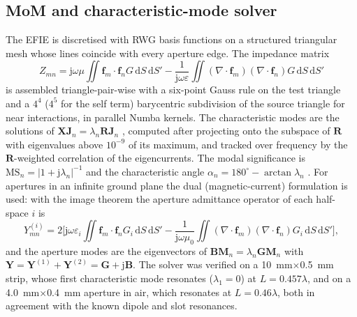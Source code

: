 \documentclass[preprint,12pt]{elsarticle}
\begin{document}
\subsection{MoM and characteristic-mode solver}
The EFIE is discretised with RWG basis functions on a structured triangular mesh whose lines coincide with every aperture edge. The impedance matrix
\begin{equation}
Z_{mn} = \mathrm{j}\omega\mu\iint \mathbf{f}_m\cdot\mathbf{f}_n G\,\mathrm{d}S\,\mathrm{d}S' - \frac{1}{\mathrm{j}\omega\varepsilon}\iint (\nabla\!\cdot\!\mathbf{f}_m)(\nabla\!\cdot\!\mathbf{f}_n) G\,\mathrm{d}S\,\mathrm{d}S'
\label{eq:zmn}
\end{equation}
is assembled triangle-pair-wise with a six-point Gauss rule on the test triangle and a $4^4$ ($4^5$ for the self term) barycentric subdivision of the source triangle for near interactions, in parallel Numba kernels. The characteristic modes are the solutions of $\mathbf{X}\mathbf{J}_n = \lambda_n\mathbf{R}\mathbf{J}_n$ \cite{harrington1971b}, computed after projecting onto the subspace of $\mathbf{R}$ with eigenvalues above $10^{-9}$ of its maximum, and tracked over frequency by the $\mathbf{R}$-weighted correlation of the eigencurrents. The modal significance is $\mathrm{MS}_n = |1+\mathrm{j}\lambda_n|^{-1}$ and the characteristic angle $\alpha_n = 180^\circ - \arctan\lambda_n$ \cite{cabedo2007}. For apertures in an infinite ground plane the dual (magnetic-current) formulation is used: with the image theorem the aperture admittance operator of each half-space $i$ is
\begin{equation}
Y^{(i)}_{mn} = 2\Big[\mathrm{j}\omega\varepsilon_i\iint \mathbf{f}_m\cdot\mathbf{f}_n G_i\,\mathrm{d}S\,\mathrm{d}S' - \frac{1}{\mathrm{j}\omega\mu_0}\iint (\nabla\!\cdot\!\mathbf{f}_m)(\nabla\!\cdot\!\mathbf{f}_n) G_i\,\mathrm{d}S\,\mathrm{d}S'\Big],
\label{eq:ymn}
\end{equation}
and the aperture modes are the eigenvectors of $\mathbf{B}\mathbf{M}_n = \lambda_n\mathbf{G}\mathbf{M}_n$ with $\mathbf{Y} = \mathbf{Y}^{(1)}+\mathbf{Y}^{(2)} = \mathbf{G}+\mathrm{j}\mathbf{B}$. The solver was verified on a \SI{10}{mm}$\times$\SI{0.5}{mm} strip, whose first characteristic mode resonates ($\lambda_1 = 0$) at $L = 0.457\lambda$, and on a \SI{4.0}{mm}$\times$\SI{0.4}{mm} aperture in air, which resonates at $L = 0.46\lambda$, both in agreement with the known dipole and slot resonances.
\end{document}
